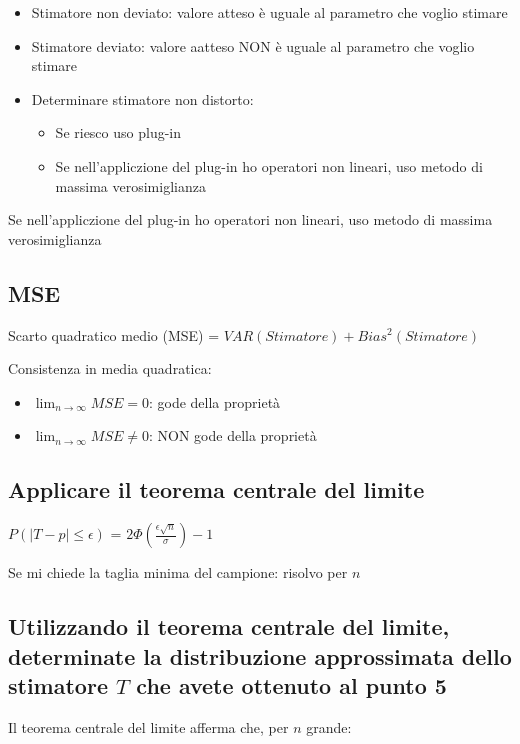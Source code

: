 \documentclass{article}
\begin{document}
\begin{itemize}
    \item Stimatore non deviato: valore atteso è uguale al parametro che voglio stimare
    \item Stimatore deviato: valore aatteso NON è uguale al parametro che voglio stimare
    \item Determinare stimatore non distorto:
    \begin{itemize}
        \item Se riesco uso plug-in 
        \item Se nell'appliczione del plug-in ho operatori non lineari, uso metodo di massima verosimiglianza
    \end{itemize}
\end{itemize}

Se nell'appliczione del plug-in ho operatori non lineari, uso metodo di massima verosimiglianza

\subsection*{MSE}

Scarto quadratico medio (MSE) = $VAR(Stimatore) + Bias^2(Stimatore)$

Consistenza in media quadratica:

\begin{itemize}
    \item $\lim_{n \to \infty}MSE = 0$: gode della proprietà
    \item $\lim_{n \to \infty}MSE \neq 0$: NON gode della proprietà
\end{itemize}

\subsection*{Applicare il teorema centrale del limite}

$P(|T - p| \leq \epsilon)$ = $2\Phi(\frac{\epsilon\sqrt{n}}{\sigma}) - 1$

Se mi chiede la taglia minima del campione: risolvo per $n$

\subsection*{Utilizzando il teorema centrale del limite, determinate la distribuzione approssimata dello stimatore $T$ che avete ottenuto al punto 5}

Il teorema centrale del limite afferma che, per $n$ grande:
\end{document}
